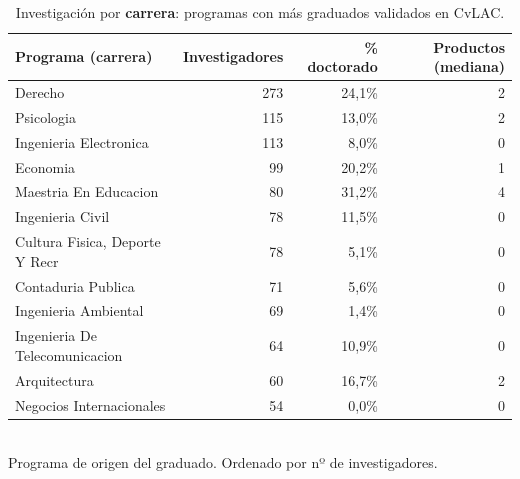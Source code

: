 \begin{table}[H]\centering\footnotesize
\caption{Investigación por \textbf{carrera}: programas con más graduados validados en CvLAC.}\label{tab:cvlac_carrera}
\begin{tabular}{lrrr}
\toprule
\rowcolor{ustaazul}\textbf{\color{white}Programa (carrera)} & \textbf{\color{white}Investigadores} & \textbf{\color{white}\% doctorado} & \textbf{\color{white}Productos (mediana)} \\
\midrule
Derecho & 273 & 24,1\% & 2 \\
Psicologia & 115 & 13,0\% & 2 \\
Ingenieria Electronica & 113 & 8,0\% & 0 \\
Economia & 99 & 20,2\% & 1 \\
Maestria En Educacion & 80 & 31,2\% & 4 \\
Ingenieria Civil & 78 & 11,5\% & 0 \\
Cultura Fisica, Deporte Y Recr & 78 & 5,1\% & 0 \\
Contaduria Publica & 71 & 5,6\% & 0 \\
Ingenieria Ambiental & 69 & 1,4\% & 0 \\
Ingenieria De Telecomunicacion & 64 & 10,9\% & 0 \\
Arquitectura & 60 & 16,7\% & 2 \\
Negocios Internacionales & 54 & 0,0\% & 0 \\
\bottomrule
\end{tabular}
\\[2pt]{\scriptsize\color{ustagris} Programa de origen del graduado. Ordenado por nº de investigadores.}
\end{table}
